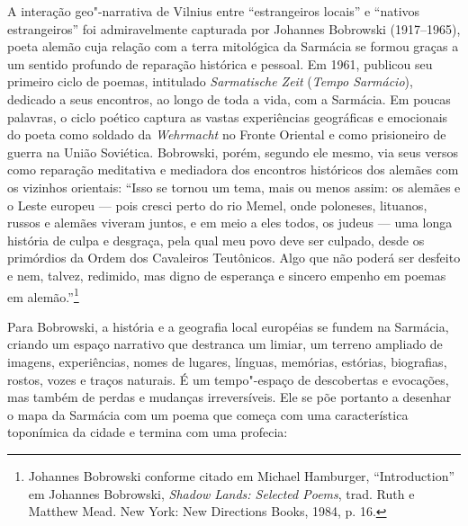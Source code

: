A interação geo"-narrativa de Vilnius entre ``estrangeiros locais'' e
``nativos estrangeiros'' foi admiravelmente capturada por Johannes
Bobrowski (1917--1965), poeta alemão cuja relação com a terra mitológica
da Sarmácia se formou graças a um sentido profundo de reparação
histórica e pessoal. Em 1961, publicou seu primeiro ciclo de poemas,
intitulado \emph{Sarmatische Zeit} (\emph{Tempo Sarmácio}), dedicado a
seus encontros, ao longo de toda a vida, com a Sarmácia. Em poucas
palavras, o ciclo poético captura as vastas experiências geográficas e
emocionais do poeta como soldado da \emph{Wehrmacht} no Fronte Oriental
e como prisioneiro de guerra na União Soviética. Bobrowski, porém,
segundo ele mesmo, via seus versos como reparação meditativa e mediadora
dos encontros históricos dos alemães com os vizinhos orientais: ``Isso
se tornou um tema, mais ou menos assim: os alemães e o Leste europeu ---
pois cresci perto do rio Memel, onde poloneses, lituanos, russos e
alemães viveram juntos, e em meio a eles todos, os judeus --- uma longa
história de culpa e desgraça, pela qual meu povo deve ser culpado, desde
os primórdios da Ordem dos Cavaleiros Teutônicos. Algo que não poderá
ser desfeito e nem, talvez, redimido, mas digno de esperança e sincero
empenho em poemas em alemão.''\footnote{Johannes Bobrowski conforme
  citado em Michael Hamburger, ``Introduction'' em Johannes Bobrowski,
  \emph{Shadow Lands: Selected Poems}, trad. Ruth e Matthew Mead. New
  York: New Directions Books, 1984, p. 16.}

Para Bobrowski, a história e a geografia local européias se fundem na
Sarmácia, criando um espaço narrativo que destranca um limiar, um
terreno ampliado de imagens, experiências, nomes de lugares, línguas,
memórias, estórias, biografias, rostos, vozes e traços naturais. É um
tempo"-espaço de descobertas e evocações, mas também de perdas e mudanças
irreversíveis. Ele se põe portanto a desenhar o mapa da Sarmácia com um
poema que começa com uma característica toponímica da cidade e termina
com uma profecia:

